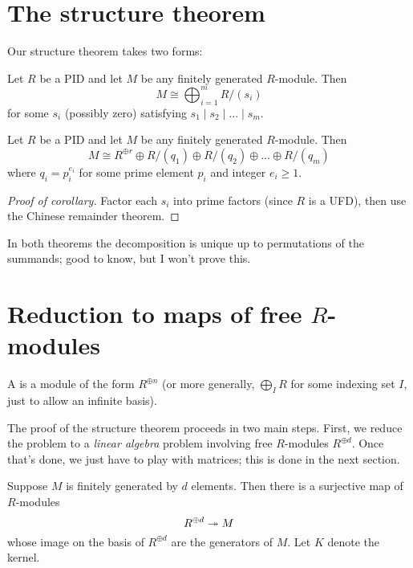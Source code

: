 \section{The structure theorem}
Our structure theorem takes two forms:
\begin{theorem}
	Let $R$ be a PID and let $M$ be any finitely generated $R$-module. Then
	\[ M \cong \bigoplus_{i=1}^m R/(s_i) \]
	for some $s_i$ (possibly zero)
	satisfying $s_1 \mid s_2 \mid \dots \mid s_m$.
\end{theorem}
\begin{corollary}
	\label{cor:structure_theorem_primary}
	Let $R$ be a PID and let $M$ be any finitely generated $R$-module. Then
	\[ M \cong R^{\oplus r}
		\oplus R/(q_1) \oplus R/(q_2) \oplus \dots \oplus R/(q_m) \]
	where $q_i = p_i^{e_i}$ for some prime element $p_i$ and integer $e_i \ge 1$.
\end{corollary}
\begin{proof}
	[Proof of corollary]
	Factor each $s_i$ into prime factors (since $R$ is a UFD),
	then use the Chinese remainder theorem.
\end{proof}
\begin{remark}
	In both theorems the decomposition is unique up to
	permutations of the summands; good to know, but
	I won't prove this.
\end{remark}

\section{Reduction to maps of free $R$-modules}
\begin{definition}
	A  is a module of the form $R^{\oplus n}$
	(or more generally, $\bigoplus_I R$ for some indexing set $I$,
	just to allow an infinite basis).
\end{definition}
The proof of the structure theorem proceeds in two main steps.
First, we reduce the problem to a \emph{linear algebra} problem
involving free $R$-modules $R^{\oplus d}$.
Once that's done, we just have to play with matrices;
this is done in the next section.

Suppose $M$ is finitely generated by $d$ elements.
Then there is a surjective map of $R$-modules
\[ R^{\oplus d} \twoheadrightarrow M \]
whose image on the basis of $R^{\oplus d}$ are the generators of $M$.
Let $K$ denote the kernel.

